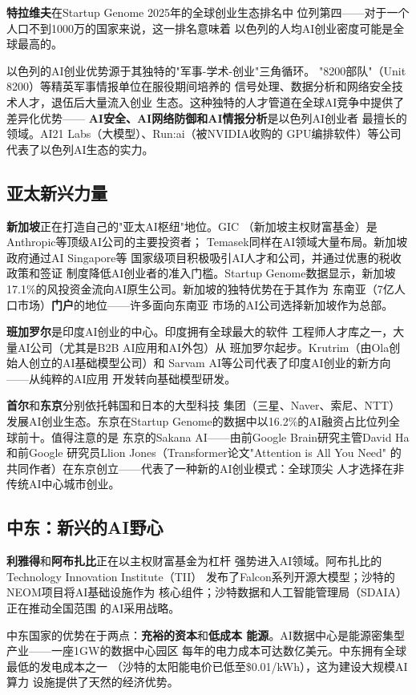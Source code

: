 \textbf{特拉维夫}在Startup Genome 2025年的全球创业生态排名中
位列第四——对于一个人口不到1000万的国家来说，这一排名意味着
以色列的人均AI创业密度可能是全球最高的。

以色列的AI创业优势源于其独特的"军事-学术-创业"三角循环。
"8200部队"（Unit 8200）等精英军事情报单位在服役期间培养的
信号处理、数据分析和网络安全技术人才，退伍后大量流入创业
生态。这种独特的人才管道在全球AI竞争中提供了差异化优势——
\textbf{AI安全、AI网络防御和AI情报分析}是以色列AI创业者
最擅长的领域。AI21 Labs（大模型）、Run:ai（被NVIDIA收购的
GPU编排软件）等公司代表了以色列AI生态的实力。

\subsection{亚太新兴力量}

\textbf{新加坡}正在打造自己的"亚太AI枢纽"地位。GIC
（新加坡主权财富基金）是Anthropic等顶级AI公司的主要投资者；
Temasek同样在AI领域大量布局。新加坡政府通过AI Singapore等
国家级项目积极吸引AI人才和公司，并通过优惠的税收政策和签证
制度降低AI创业者的准入门槛。Startup Genome数据显示，新加坡
17.1\%的风投资金流向AI原生公司。新加坡的独特优势在于其作为
东南亚（7亿人口市场）\textbf{门户}的地位——许多面向东南亚
市场的AI公司选择新加坡作为总部。

\textbf{班加罗尔}是印度AI创业的中心。印度拥有全球最大的软件
工程师人才库之一，大量AI公司（尤其是B2B AI应用和AI外包）从
班加罗尔起步。Krutrim（由Ola创始人创立的AI基础模型公司）和
Sarvam AI等公司代表了印度AI创业的新方向——从纯粹的AI应用
开发转向基础模型研发。

\textbf{首尔}和\textbf{东京}分别依托韩国和日本的大型科技
集团（三星、Naver、索尼、NTT）发展AI创业生态。东京在Startup
Genome的数据中以16.2\%的AI融资占比位列全球前十。值得注意的是
东京的Sakana AI——由前Google Brain研究主管David Ha和前Google
研究员Llion Jones（Transformer论文"Attention is All You Need"
的共同作者）在东京创立——代表了一种新的AI创业模式：全球顶尖
人才选择在非传统AI中心城市创业。

\subsection{中东：新兴的AI野心}

\textbf{利雅得}和\textbf{阿布扎比}正在以主权财富基金为杠杆
强势进入AI领域。阿布扎比的Technology Innovation Institute（TII）
发布了Falcon系列开源大模型；沙特的NEOM项目将AI基础设施作为
核心组件；沙特数据和人工智能管理局（SDAIA）正在推动全国范围
的AI采用战略。

中东国家的优势在于两点：\textbf{充裕的资本}和\textbf{低成本
能源}。AI数据中心是能源密集型产业——一座1GW的数据中心园区
每年的电力成本可达数亿美元。中东拥有全球最低的发电成本之一
（沙特的太阳能电价已低至\$0.01/kWh），这为建设大规模AI算力
设施提供了天然的经济优势。

